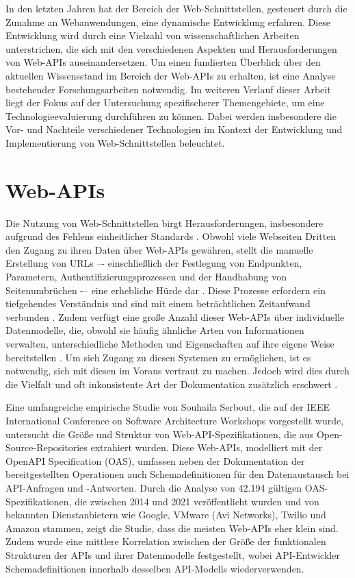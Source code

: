 \documentclass[draft,final]{vutinfth} %
\begin{document}
In den letzten Jahren hat der Bereich der Web-Schnittstellen, gesteuert durch die Zunahme an Webanwendungen, eine dynamische Entwicklung erfahren. Diese Entwicklung wird durch eine Vielzahl von wissenschaftlichen Arbeiten unterstrichen, die sich mit den verschiedenen Aspekten und Herausforderungen von Web-APIs auseinandersetzen. 
Um einen fundierten Überblick über den aktuellen Wissensstand im Bereich der Web-APIs zu erhalten, ist eine Analyse bestehender Forschungsarbeiten notwendig.  
Im weiteren Verlauf dieser Arbeit liegt der Fokus auf der Untersuchung spezifischerer Themengebiete, um eine Technologieevaluierung durchführen zu können. 
Dabei werden insbesondere die Vor- und Nachteile verschiedener Technologien im Kontext der Entwicklung und Implementierung von Web-Schnittstellen beleuchtet.


\section{Web-APIs}

Die Nutzung von Web-Schnittstellen birgt Herausforderungen, insbesondere aufgrund des Fehlens einheitlicher Standards \cite{Standardizing_APIs}. 
Obwohl viele Webseiten Dritten den Zugang zu ihren Daten über Web-APIs gewähren, stellt die manuelle Erstellung von URLs –- einschließlich der Festlegung von Endpunkten, Parametern, Authentifizierungsprozessen und der Handhabung von Seitenumbrüchen -– eine erhebliche Hürde dar 
\cite{Standardizing_APIs, Investigation_Web-APIs}. 
Diese Prozesse erfordern ein tiefgehendes Verständnis und sind mit einem beträchtlichen Zeitaufwand verbunden \cite{Standardizing_APIs}. 
Zudem verfügt eine große Anzahl dieser Web-APIs über individuelle Datenmodelle, die, obwohl sie häufig ähnliche Arten von Informationen verwalten, unterschiedliche Methoden und Eigenschaften auf ihre eigene Weise bereitstellen \cite{Standardizing_APIs}.
Um sich Zugang zu diesen Systemen zu ermöglichen, ist es notwendig, sich mit diesen im Voraus vertraut zu machen. 
Jedoch wird dies durch die Vielfalt und oft inkonsistente Art der Dokumentation zusätzlich erschwert \cite{Investigation_Web-APIs}.

Eine umfangreiche empirische Studie von Souhaila Serbout, die auf der IEEE International Conference on Software Architecture Workshops vorgestellt wurde, untersucht die Größe und Struktur von Web-API-Spezifikationen, die aus Open-Source-Repositories extrahiert wurden. Diese Web-APIs, modelliert mit der OpenAPI Specification (OAS), umfassen neben der Dokumentation der bereitgestellten Operationen auch Schemadefinitionen für den Datenaustausch bei API-Anfragen und -Antworten. Durch die Analyse von 42.194 gültigen OAS-Spezifikationen, die zwischen 2014 und 2021 veröffentlicht wurden und von bekannten Dienstanbietern wie Google, VMware (Avi Networks), Twilio und Amazon stammen, zeigt die Studie, dass die meisten Web-APIs eher klein sind. Zudem wurde eine mittlere Korrelation zwischen der Größe der funktionalen Strukturen der APIs und ihrer Datenmodelle festgestellt, wobei API-Entwickler Schemadefinitionen innerhalb desselben API-Modells wiederverwenden\cite{Serbout2021APIStudy}.
\end{document}
